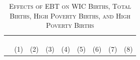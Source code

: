 \begin{table}[!htbp]
	\begin{center}
		\caption{\textsc{Effects of EBT on WIC Births, Total Births, High Poverty Births, and High Poverty Births}} 
		\label{} 
		\scriptsize
		\begin{tabularx}{\linewidth}{@{}l*{8}{>{\centering\arraybackslash}X}@{}}
			\\[-1.8ex]\hline 
			\hline 
			\\[-1.8ex] 
			& \multicolumn{2}{c}{WIC Births} & \multicolumn{2}{c}{Total Births} & \multicolumn{2}{c}{High Poverty} & \multicolumn{2}{c}{High Poverty}  \\
			& \multicolumn{2}{c}{} & \multicolumn{2}{c}{} & \multicolumn{2}{c}{WIC Births} & \multicolumn{2}{c}{Births}  \\
			\cmidrule(lr){2-3}\cmidrule(lr){4-5} \cmidrule(lr){6-7}\cmidrule(lr){8-9}
			& (1)     & (2)      & (3)    & (4)  & (5)     & (6)      & (7)    & (8)    \\
			\midrule
			

\end{tabularx}
\end{center}
\end{table}
